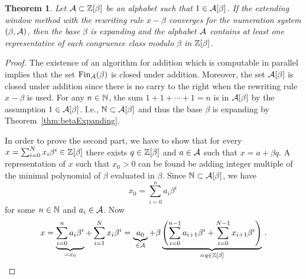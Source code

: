 \documentclass{article}
\newtheorem{theo}{Theorem}
\begin{document}
\begin{theo}
Let $\mathcal{A}\subset \mathbb{Z}[\beta]$ be an alphabet such that $1\in \mathcal{A}[\beta]$. If the extending window method with the rewriting rule $x-\beta$ converges for the numeration system $(\beta, \mathcal{A})$, then the base $\beta$ is expanding and the alphabet $\mathcal{A}$ contains at least one representative of each congruence class modulo $\beta$ in $\mathbb{Z}[\beta]$. 
\end{theo}
\begin{proof}
The existence of an algorithm for addition which is computable in parallel implies that the set $\text{Fin}_{\mathcal{A}}(\beta)$ is closed under addition. Moreover, the set $\mathcal{A}[\beta]$ is closed under addition since there is no carry to the right when the rewriting rule $x-\beta$ is used. For any $n\in\mathbb{N}$, the sum $1+1+\cdots +1=n$ is in $\mathcal{A}[\beta]$ by the assumption $1\in \mathcal{A}[\beta]$. I.e., $\mathbb{N}\subset \mathcal{A}[\beta]$ and thus the base $\beta$ is expanding by Theorem~\ref{thm:betaExpanding}.

In order to prove the second part, we have to show that for every $x=\sum_{i=0}^N x_i \beta^i \in\mathbb{Z}[\beta]$ there exists $q\in\mathbb{Z}[\beta]$ and $a\in\mathcal{A}$ such that $x=a+\beta q$. A representation of $x$ such that $x_0> 0$ can be found be adding integer multiple of the minimal polynomial of $\beta$ evaluated in $\beta$. Since $\mathbb{N}\subset \mathcal{A}[\beta]$, we have
$$
x_0=\sum_{i=0}^{n}a_i\beta^i\,
    $$
    for some $n\in\mathbb{N}$ and $a_i\in\mathcal{A}$. Now
    $$
    x=\underbrace{\sum_{i=0}^{n}a_i\beta^i}_{=x_0} + \sum_{i=1}^N x_i \beta^i=\underbrace{a_0}_{\in\mathcal{A}} + \beta \underbrace{\left(\sum_{i=0}^{n-1}a_{i+1}\beta^i + \sum_{i=0}^{N-1} x_{i+1} \beta^i\right)}_{=q\in\mathbb{Z}[\beta]}\,.
    $$
\end{proof}
\end{document}
